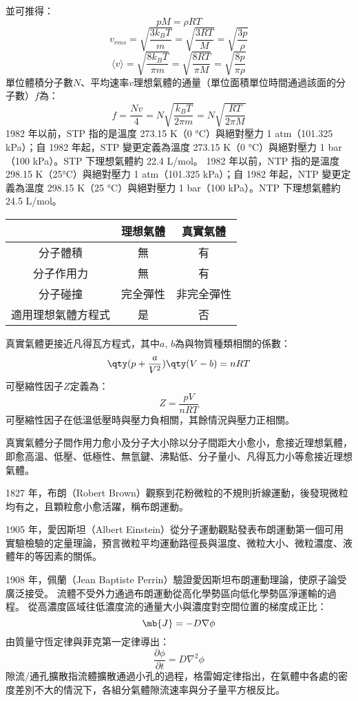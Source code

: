 \documentclass[a4paper,12pt]{report}
\begin{document}
並可推得：
\[pM=\rho RT\]
\[v_{rms}=\sqrt{\frac{3k_BT}{m}}=\sqrt{\frac{3RT}{M}}=\sqrt{\frac{3p}{\rho}}\]
\[\langle v \rangle = \sqrt{\frac{8k_BT}{\pi m}}=\sqrt{\frac{8RT}{\pi M}}=\sqrt{\frac{8p}{\pi \rho}}\]
單位體積分子數$N$、平均速率$v$理想氣體的通量（單位面積單位時間通過該面的分子數）$f$為：
\[f=\frac{Nv}{4}=N\sqrt{\frac{k_BT}{2\pi m}}=N\sqrt{\frac{RT}{2\pi M}}\]
1982 年以前，STP 指的是溫度 273.15 K（0 °C）與絕對壓力 1 atm（101.325 kPa）；自 1982 年起，STP 變更定義為溫度 273.15 K（0 °C）與絕對壓力 1 bar（100 kPa）。STP 下理想氣體約 22.4 L/mol。
1982 年以前，NTP 指的是溫度 298.15 K（25°C）與絕對壓力 1 atm（101.325 kPa）；自 1982 年起，NTP 變更定義為溫度 298.15 K（25 °C）與絕對壓力 1 bar（100 kPa）。NTP 下理想氣體約 24.5 L/mol。
\begin{longtable}[c]{|c|c|c|}
\hline
& 理想氣體 & 真實氣體 \\\hline\endhead
分子體積 & 無 & 有 \\\hline
分子作用力 & 無 & 有 \\\hline
分子碰撞 & 完全彈性 & 非完全彈性 \\\hline
適用理想氣體方程式 & 是 & 否 \\\hline
\end{longtable}\FB
{}
真實氣體更接近凡得瓦方程式，其中$a$, $b$為與物質種類相關的係數：
\[\qty(p + \frac{a}{V^2})\qty(V - b) = nRT\]
可壓縮性因子$Z$定義為：
\[Z=\frac{pV}{nRT}\]
可壓縮性因子在低溫低壓時與壓力負相關，其餘情況與壓力正相關。

真實氣體分子間作用力愈小及分子大小除以分子間距大小愈小，愈接近理想氣體，即愈高溫、低壓、低極性、無氫鍵、沸點低、分子量小、凡得瓦力小等愈接近理想氣體。


\bit
\item 1827 年，布朗（Robert Brown）觀察到花粉微粒的不規則折線運動，後發現微粒均有之，且顆粒愈小愈活躍，稱布朗運動。
\item 1905 年，愛因斯坦（Albert Einstein）從分子運動觀點發表布朗運動第一個可用實驗檢驗的定量理論，預言微粒平均運動路徑長與溫度、微粒大小、微粒濃度、液體年的等因素的關係。
\item 1908 年，佩蘭（Jean Baptiste Perrin）驗證愛因斯坦布朗運動理論，使原子論受廣泛接受。
\eit
{}
流體不受外力通過布朗運動從高化學勢區向低化學勢區淨運輸的過程。
從高濃度區域往低濃度流的通量大小與濃度對空間位置的梯度成正比：
\[\mb{J}=-D\nabla\phi\]
由質量守恆定律與菲克第一定律導出：
\[\frac{\partial\phi}{\partial t}=D\nabla^2\phi\]
隙流/通孔擴散指流體擴散通過小孔的過程，格雷姆定律指出，在氣體中各處的密度差別不大的情況下，各組分氣體隙流速率與分子量平方根反比。
\end{document}
